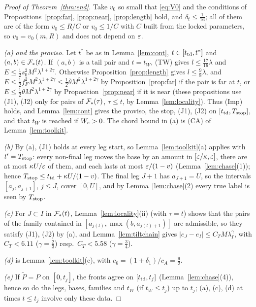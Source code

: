 \begin{proof}[Proof of Theorem~\ref{thm:end}]
Take $v_0$ so small that \eqref{eq:V0} and the conditions of Propositions~\ref{prop:far}, \ref{prop:near},
\ref{prop:length} hold, and $\delta_t\le\frac1{16}$; all of them are of the form $v_0\le R/C$ or $v_0\le1/C$ with $C$
built from the locked parameters, so $v_0=v_0(m,R)$ and does not depend on $\varepsilon$.

\emph{(a) and the proviso.} Let $t^*$ be as in Lemma~\ref{lem:cont}, $t\in[t_{\mathrm{td}},t^*]$ and $(a,b)\in\mathcal{F}_*(t)$. If $(a,b)$
is a tail pair and $t=t_W$, (TW) gives $l\le\frac{17}{16}\lambda$ and $E\le\frac12s_0^2M^2\lambda^{1+2\gamma}$. Otherwise
Proposition~\ref{prop:length} gives $l\le\frac98\lambda$, and $E\le\frac12f_F^2M^2\lambda^{1+2\gamma}\le\frac12\bar\theta
M^2\lambda^{1+2\gamma}$ by Proposition~\ref{prop:far} if the pair is far at $t$, or $E\le\frac12\bar\theta M^2\lambda^{1+2\gamma}$
by Proposition~\ref{prop:near} if it is near (these propositions use (J1), (J2) only for pairs of $\mathcal{F}_*(\tau)$,
$\tau\le t$, by Lemma~\ref{lem:locality}). Thus (Imp) holds, and
Lemma~\ref{lem:cont} gives the proviso, the stop, (J1), (J2) on $[t_{\mathrm{td}},T_{\mathrm{stop}}]$, and that $t_W$ is reached if $W_{\mathrm{e}}>0$.
The chord bound in (a) is (CA) of Lemma~\ref{lem:toolkit}.

\emph{(b)} By (a), (J1) holds at every leg start, so Lemma~\ref{lem:toolkit}(a) applies with $t'=T_{\mathrm{stop}}$: every
non-final leg moves the base by an amount in $[\varepsilon/\kappa,\varepsilon]$, there are at most $\kappa U/\varepsilon$ of them, and each
lasts at most $\varepsilon/(1-v)$ (Lemma~\ref{lem:chase}(1)); hence $T_{\mathrm{stop}}\le t_{\mathrm{td}}+\kappa U/(1-v)$. The final leg $J+1$
has $a_{J+1}=U$, so the intervals $[a_j,a_{j+1}]$, $j\le J$, cover $[0,U]$, and by Lemma~\ref{lem:chase}(2) every true
label is seen by $T_{\mathrm{stop}}$.

\emph{(c)} For $J\subset I$ in $\mathcal{F}_*(t)$, Lemma~\ref{lem:locality}(ii) (with $\tau=t$) shows that the pairs of the
family contained in $[a_{j(t)},\max(b,a_{j(t)+1})]$ are admissible, so they satisfy (J1), (J2) by (a), and
Lemma~\ref{lem:tiltchain} gives $|e_J-e_I|\le C_TM\lambda_I^\gamma$, with $C_T<6.11$ ($\gamma=\frac23$) resp.\
$C_T<5.58$ ($\gamma=\frac34$).

\emph{(d)} is Lemma~\ref{lem:toolkit}(c), with $c_6=(1+\delta_1)/c_A=\frac92$.

\emph{(e)} If $\tilde P=P$ on $[0,t_j]$, the fronts agree on $[t_{\mathrm{td}},t_j]$ (Lemma~\ref{lem:chase}(4)), hence so do
the legs, bases, families and $t_W$ (if $t_W\le t_j$) up to $t_j$; (a), (c), (d) at times $t\le t_j$ involve only these
data.
\end{proof}
